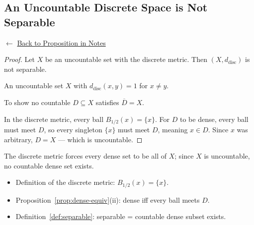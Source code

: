 
\subsection*{An Uncountable Discrete Space is Not Separable}
\label{prf:discrete-not-sep}

\begin{remark*}[Return]
$\leftarrow$ \hyperref[prop:discrete-not-sep]{Back to Proposition in Notes}
\end{remark*}

\begin{proof}
\Claim Let $X$ be an uncountable set with the discrete metric.
Then $(X, d_{\mathrm{disc}})$ is not separable.

\Given An uncountable set $X$ with $d_{\mathrm{disc}}(x,y) = 1$ for $x \neq y$.

\Goal To show no countable $D \subseteq X$ satisfies $\overline{D} = X$.

\Strategy In the discrete metric, every ball $B_{1/2}(x) = \{x\}$.
For $D$ to be dense, every ball must meet $D$, so every singleton
$\{x\}$ must meet $D$, meaning $x \in D$.
Since $x$ was arbitrary, $D = X$ --- which is uncountable.


\end{proof}

\begin{remark*}
The discrete metric forces every dense set to be all of $X$;
since $X$ is uncountable, no countable dense set exists.
\end{remark*}

\begin{remark*}[Dependencies]
\begin{itemize}
  \item Definition of the discrete metric: $B_{1/2}(x) = \{x\}$.
  \item Proposition~\ref{prop:dense-equiv}(ii): dense iff every ball meets $D$.
  \item Definition~\ref{def:separable}: separable = countable dense subset exists.
\end{itemize}
\end{remark*}
